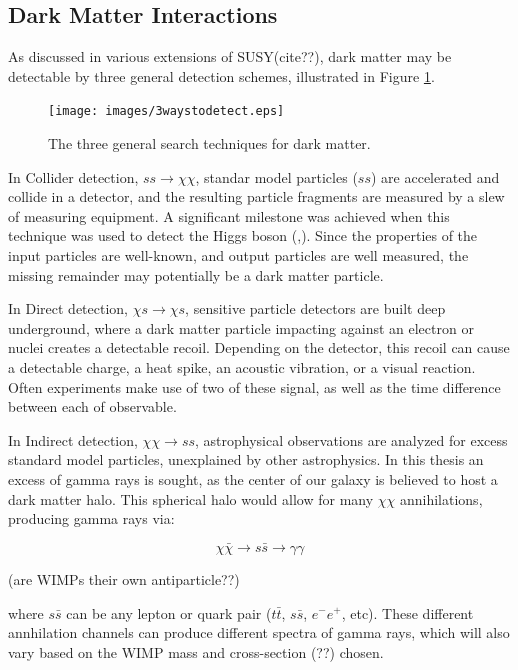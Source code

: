\subsection{Dark Matter Interactions}
As discussed in various extensions of SUSY{\color{red}(cite??)}, dark matter may be detectable by three general detection schemes, illustrated in Figure \ref{fig:3_searches}.

\begin{figure}[ht]
  \centering
  \texttt{[image: images/3waystodetect.eps]}
  \caption[3 Search Techniques]{
    The three general search techniques for dark matter.}
  \label{fig:3_searches}
\end{figure}

In Collider detection, $ss \rightarrow \chi\chi$, standar model particles ($ss$) are accelerated and collide in a detector, and the resulting particle fragments are measured by a slew of measuring equipment.
A significant milestone was achieved when this technique was used to detect the Higgs boson (\cite{Higs_ATLAS},\cite{Higgs_CMS}).
Since the properties of the input particles are well-known, and output particles are well measured, the missing remainder may potentially be a dark matter particle.

In Direct detection, $\chi s \rightarrow \chi s$, sensitive particle detectors are built deep underground, where a dark matter particle impacting against an electron or nuclei creates a detectable recoil.
Depending on the detector, this recoil can cause a detectable charge, a heat spike, an acoustic vibration, or a visual reaction.
Often experiments make use of two of these signal, as well as the time difference between each of observable.

In Indirect detection, $\chi\chi \rightarrow ss$, astrophysical observations are analyzed for excess standard model particles, unexplained by other astrophysics.
In this thesis an excess of gamma rays is sought, as the center of our galaxy is believed to host a dark matter halo.
This spherical halo would allow for many $\chi\chi$ annihilations, producing gamma rays via: 

$$\chi\bar{\chi} \rightarrow s\bar{s} \rightarrow \gamma\gamma$$

{\color{red}(are WIMPs their own antiparticle??)}

where $s\bar{s}$ can be any lepton or quark pair ($t\bar{t}$, $s\bar{s}$, $e^{-}e^{+}$, etc).
These different annhilation channels can produce different spectra of gamma rays, which will also vary based on the WIMP mass and cross-section {\color{red}(??)} chosen.

